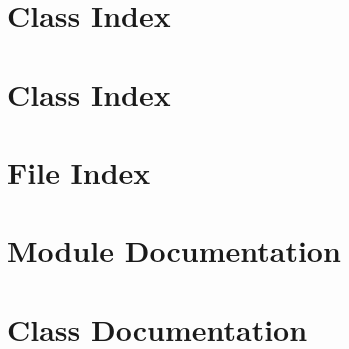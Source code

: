 \documentclass[a4paper]{book}
\begin{document}
\chapter{Class Index}

\chapter{Class Index}

\chapter{File Index}

\chapter{Module Documentation}















\chapter{Class Documentation}











\end{document}
